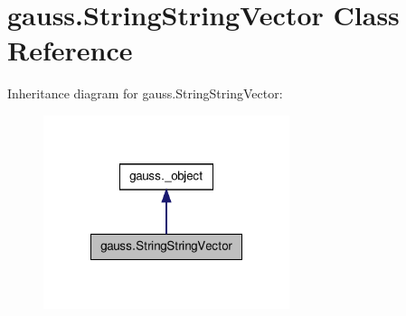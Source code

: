 \hypertarget{classgauss_1_1_string_string_vector}{\section{gauss.\-String\-String\-Vector Class Reference}
\label{classgauss_1_1_string_string_vector}
}


Inheritance diagram for gauss.\-String\-String\-Vector\-:\nopagebreak
\begin{figure}[H]
\begin{center}
\leavevmode
\includegraphics[width=204pt]{classgauss_1_1_string_string_vector__inherit__graph}
\end{center}
\end{figure}
